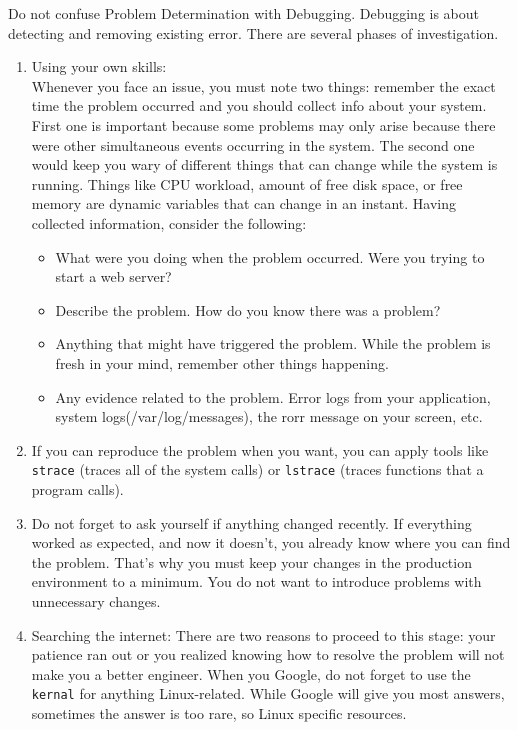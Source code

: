 \documentclass[11pt]{article}
\begin{document}
\begin{enumerate}
\noindent Do not confuse Problem Determination with Debugging. Debugging is about detecting and removing existing error. There are several phases of investigation.
\begin{enumerate}
    \item Using your own skills:\\ Whenever you face an issue, you must note two things: remember the exact time the problem occurred and you should collect info about your system. First one is important because some problems may only arise because there were other simultaneous events occurring in the system. The second one would keep you wary of different things that can change while the system is running. Things like CPU workload, amount of free disk space, or free memory are dynamic variables that can change in an instant. Having collected information, consider the following:
\begin{itemize}
    \item What were you doing when the problem occurred. Were you trying to start a web server?
    \item Describe the problem. How do you know there was a problem?
    \item Anything that might have triggered the problem. While the problem is fresh in your mind, remember other things happening.
    \item Any evidence related to the problem. Error logs from your application, system logs(/var/log/messages), the rorr message on your screen, etc.
\end{itemize}
    \item[] If you can reproduce the problem when you want, you can apply tools like \texttt{strace} (traces all of the system calls) or \texttt{lstrace} (traces functions that a program calls). 
    \item[] Do not forget to ask yourself if anything changed recently. If everything worked as expected, and now it doesn't, you already know where you can find the problem. That's why you must keep your changes in the production environment to a minimum. You do not want to introduce problems with unnecessary changes.



    \item Searching the internet: There are two reasons to proceed to this stage: your patience ran out or you realized knowing how to resolve the problem will not make you a better engineer. When you Google, do not forget to use the \texttt{kernal} for anything Linux-related. While Google will give you most answers, sometimes the answer is too rare, so Linux specific resources.




\end{enumerate}
\end{enumerate}
\end{document}

